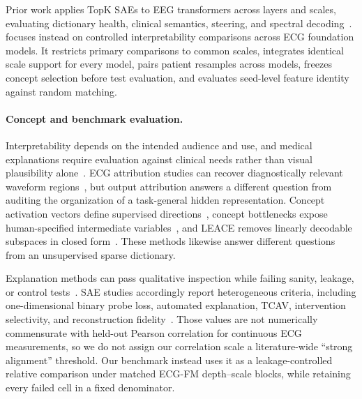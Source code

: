 Prior work applies TopK SAEs to EEG transformers across layers and scales, evaluating dictionary health, clinical semantics, steering, and spectral decoding~\cite{lehnschioler2026eegsae}. \bench{} focuses instead on controlled interpretability comparisons across ECG foundation models. It restricts primary comparisons to common scales, integrates identical scale support for every model, pairs patient resamples across models, freezes concept selection before test evaluation, and evaluates seed-level feature identity against random matching.

\paragraph{Concept and benchmark evaluation.}
Interpretability depends on the intended audience and use, and medical explanations require evaluation against clinical needs rather than visual plausibility alone~\cite{murdoch2019definitions,rudin2019blackbox,tonekaboni2019clinicians,ghassemi2021falsehope}. ECG attribution studies can recover diagnostically relevant waveform regions~\cite{strodthoff2019mi}, but output attribution answers a different question from auditing the organization of a task-general hidden representation. Concept activation vectors define supervised directions~\cite{kim2018tcav}, concept bottlenecks expose human-specified intermediate variables~\cite{koh2020concept}, and LEACE removes linearly decodable subspaces in closed form~\cite{belrose2023leace}. These methods likewise answer different questions from an unsupervised sparse dictionary.

Explanation methods can pass qualitative inspection while failing sanity, leakage, or control tests~\cite{adebayo2018sanity,jethani2023leakage}. SAE studies accordingly report heterogeneous criteria, including one-dimensional binary probe loss, automated explanation, TCAV, intervention selectivity, and reconstruction fidelity~\cite{gao2025scaling,lehnschioler2026eegsae,karvonen2025saebench}. Those values are not numerically commensurate with held-out Pearson correlation for continuous ECG measurements, so we do not assign our correlation scale a literature-wide ``strong alignment'' threshold. Our benchmark instead uses it as a leakage-controlled relative comparison under matched ECG-FM depth--scale blocks, while retaining every failed cell in a fixed denominator.
